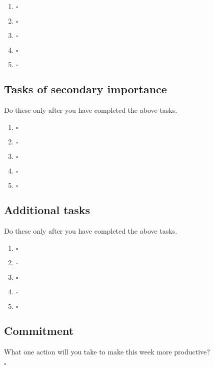 \documentclass[11pt, oneside, twocolumn]{article}   	%
\begin{document}
\begin{enumerate}[label=\textbf{\arabic*}.]
\item \hrulefill \enspace $\square$
\item \hrulefill \enspace $\square$
\item \hrulefill \enspace $\square$
\item \hrulefill \enspace $\square$
\item \hrulefill \enspace $\square$
\end{enumerate}

\subsection*{Tasks of secondary importance}
\vspace{-0.9em}
{\footnotesize Do these only after you have completed the above tasks.}

\begin{enumerate}[resume, label=\textbf{\arabic*}.]
\item \hrulefill \enspace $\square$
\item \hrulefill \enspace $\square$
\item \hrulefill \enspace $\square$
\item \hrulefill \enspace $\square$
\item \hrulefill \enspace $\square$
\end{enumerate}

\subsection*{Additional tasks}
\vspace{-0.9em}
{\footnotesize Do these only after you have completed the above tasks.}

\begin{enumerate}[resume, label=\textbf{\arabic*}.]
\item \hrulefill \enspace $\square$
\item \hrulefill \enspace $\square$
\item \hrulefill \enspace $\square$
\item \hrulefill \enspace $\square$
\item \hrulefill \enspace $\square$
\end{enumerate}

\subsection*{Commitment}
\vspace{-0.9em}
{\footnotesize What one action will you take to make this week more productive?}

\hrulefill \enspace $\square$
\end{document}
